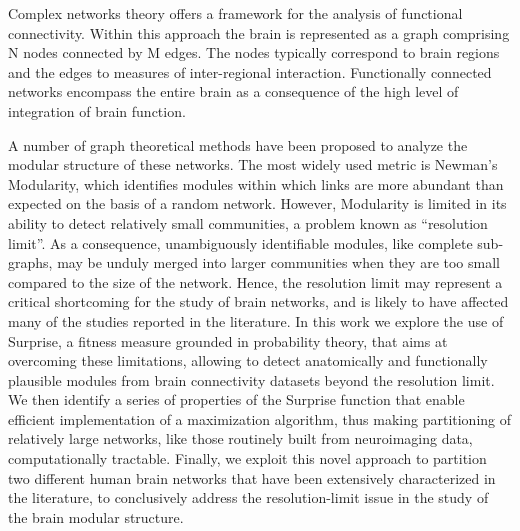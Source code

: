 Complex networks theory offers a framework for the analysis of functional connectivity.
Within this approach the brain is represented as a graph comprising N nodes connected by M edges.
The nodes typically correspond to brain regions and the edges to measures of inter-regional interaction.
Functionally connected networks encompass the entire brain as a consequence of the high level of integration of brain function.

A number of graph theoretical methods have been proposed to analyze the modular structure of these networks.
The most widely used metric is Newman's Modularity, which identifies modules within which links are more abundant than expected on the basis of a random network.
However, Modularity is limited in its ability to detect relatively small communities, a problem known as “resolution limit”.
As a consequence, unambiguously identifiable modules, like complete sub-graphs, may be unduly merged into larger communities when they are too small compared to the size of the network.
Hence, the resolution limit may represent a critical shortcoming for the study of brain networks, and is likely to have affected many of the studies reported in the literature.
In this work we explore the use of Surprise, a fitness measure grounded in probability theory, that aims at overcoming these limitations, allowing to detect anatomically and functionally plausible modules from brain connectivity datasets beyond the resolution limit.
We then identify a series of properties of the Surprise function that enable efficient implementation of a maximization algorithm, thus making partitioning of relatively large networks, like those routinely built from neuroimaging data, computationally tractable.
Finally, we exploit this novel approach to partition two different human brain networks that have been extensively characterized in the literature, to conclusively address the resolution-limit issue in the study of the brain modular structure.